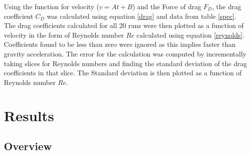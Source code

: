 \documentclass[paper=a4, fontsize=11pt, abstract=on]{scrartcl}
\numberwithin{equation}{section}		%
\numberwithin{figure}{section}			%
\numberwithin{table}{section}				%
\begin{document}
Using the function for velocity ($v = At+B$) and the Force of drag $F_D$, the drag coefficient $C_D$ was calculated using equation \ref{drag} and data from table \ref{spec}. The drag coefficients calculated for all 20 runs were then plotted as a function of velocity in the form of Reynolds number $Re$ calculated using equation \ref{reynolds}. Coefficients found to be less than zero were ignored as this implies faster than gravity acceleration. The error for the calculation was computed by incrementally taking slices for Reynolds numbers and finding the standard deviation of the drag coefficients in that slice. The Standard deviation is then plotted as a function of Reynolds number $Re$.
 
 
 
   
\section{Results}
\subsection{Overview}
\end{document}
